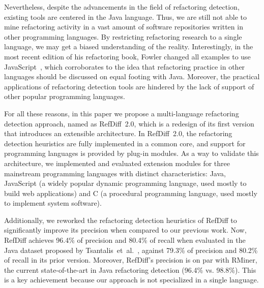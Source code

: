 Nevertheless, despite the advancements in the field of refactoring detection, existing tools are centered in the Java language.
Thus, we are still not able to mine refactoring activity in a vast amount of software repositories written in other programming languages.
By restricting refactoring research to a single language, we may get a biased understanding of the reality.
Interestingly, in the most recent edition of his refactoring book, Fowler changed all examples to use JavaScript~\cite{fowler2018refactoring}, which corroborates to the idea that refactoring practice in other languages should be discussed on equal footing with Java.
Moreover, the practical applications of refactoring detection tools are hindered by the lack of support of other popular programming languages.

For all these reasons, in this paper we propose a multi-language refactoring detection approach, named as RefDiff~2.0, which is a redesign of its first version that introduces an extensible architecture.
In RefDiff~2.0, the refactoring detection heuristics are fully implemented in a common core, and support for programming languages is provided by plug-in modules.
As a way to validate this architecture, we implemented and evaluated extension modules for three mainstream programming languages with distinct characteristics: Java, JavaScript (a widely popular dynamic programming language, used mostly to build web applications) and C (a procedural programming language, used mostly to implement system software).

Additionally, we reworked the refactoring detection heuristics of RefDiff to significantly improve its precision when compared to our previous work.
Now, RefDiff achieves 96.4\% of precision and 80.4\% of recall when evaluated in the Java dataset proposed by Tsantalis~et~al.~\cite{tsantalis2018rminer}, against 79.3\% of precision and 80.2\% of recall in its prior version.
Moreover, RefDiff's precision is on par with RMiner, the current state-of-the-art in Java refactoring detection (96.4\% vs. 98.8\%).
This is a key achievement because our approach is not specialized in a single language.

